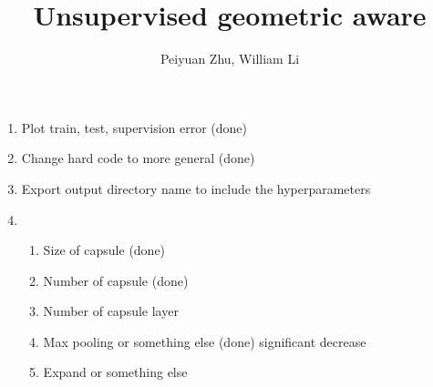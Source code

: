 \documentclass{article}
\author{Peiyuan Zhu, William Li}
\title{Unsupervised geometric aware}
\begin{document}
	\maketitle
	\begin{enumerate}
		\item Plot train, test, supervision error (done)
		\item Change hard code to more general (done)
		\item Export output directory name to include the hyperparameters
		\item 
		\begin{enumerate}
			\item Size of capsule (done)
			\item Number of capsule (done)
			\item Number of capsule layer
			\item Max pooling or something else (done) significant decrease
			\item Expand or something else
		\end{enumerate}
	\end{enumerate}
\end{document}
